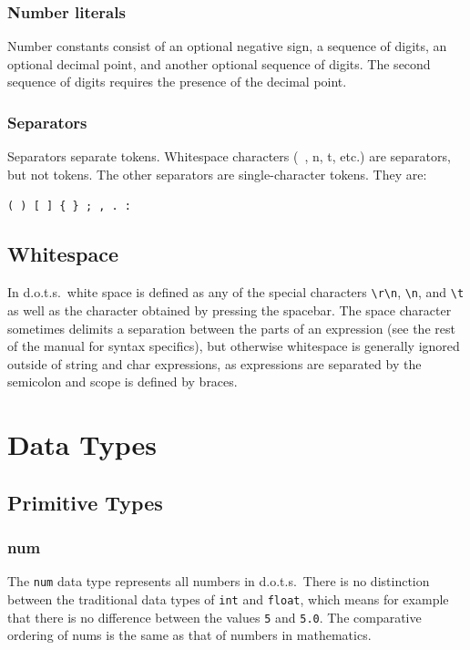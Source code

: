 \documentclass{article}
\newcommand{\pltlang}{d.o.t.s.} %
\newcommand{\code}[1]{\texttt{#1}} %
\begin{document}
\subsubsection{Number literals}

Number constants consist of an optional negative sign, a sequence of digits, 
an optional decimal point, and another optional sequence of digits. The second 
sequence of digits requires the presence of the decimal point.

\subsubsection{Separators}

Separators separate tokens. Whitespace characters (\textquotesingle \ \textquotesingle, \textquotesingle{\textbackslash}n\textquotesingle, \textquotesingle{\textbackslash}t\textquotesingle, etc.) are separators, but not 
tokens. The other separators are single-character tokens. They are:

\code{( ) [ ] \{ \} ; , . :}

\subsection {Whitespace}
In \pltlang\, white space is defined as any of the special characters \code{\textbackslash r\textbackslash n}, \code{\textbackslash n},  and \code{\textbackslash t} as well as the character obtained by pressing the spacebar. The space character sometimes delimits a separation between the parts of an expression (see the rest of the manual for syntax specifics), but otherwise whitespace is generally ignored outside of string and char expressions, as expressions are separated by the semicolon and scope is defined by braces. 


\section{Data Types}

\subsection{Primitive Types}

\subsubsection{num}

The \code{num} data type represents all numbers in \pltlang\ There is no distinction between the traditional data types of \code{int} and \code{float}, which means for example that there is no difference between the values \code{5} and \code{5.0}. The comparative ordering of nums is the same as that of numbers in mathematics. 
\end{document}
